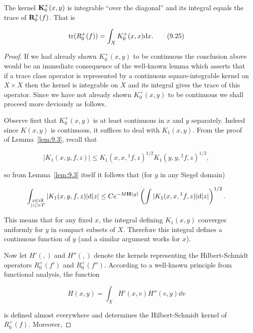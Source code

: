 \begin{theorem}\label{thm:9.7}

The kernel $\mathbf{K}_0^{+}(x, y)$ is integrable ``over the diagonal'' and its integral equals the trace of $\mathbf{R}_0^{+}(f)$. That is

\begin{equation}\label{eq:9.25}
\operatorname{tr}(R_0^{+}(f)) = \int_X K_0^{+}(x, x)\mathrm{d} x.\tag{9.25}
\end{equation}

\end{theorem}

\begin{proof}

If we had already shown $K_0^{+}(x,y)$ to be continuous the conclusion above would be an immediate consequence of the well-known lemma which asserts that if a trace class operator is represented by a continuous square-integrable kernel on $X \times X$ then the kernel is integrable on $X$ and its integral gives the trace of this operator. Since we have not already shown $K_0^{+}(x,y)$ to be continuous we shall proceed more deviously as follows.

Observe first that $K_0^{+}(x,y)$ is at least continuous in $x$ and $y$ separately. Indeed since $K(x,y)$ is continuous, it suffices to deal with $K_1(x,y)$. From the proof of Lemma~\ref{lem:9.3}, recall that

\[
|K_1(x, y, f, z)| \leq K_1(x, x, {}^{1}f, z)^{1/2}K_1(y, y, {}^{2}f, z)^{1/2},
\]

so from Lemma~\ref{lem:9.3} itself it follows that (for $y$ in any Siegel domain)

\[
\int_{\substack{z \in i\mathbb{R}\\ |z| > T}} |K_1(x, y, f, z)|\mathrm{d}|z| \leq Ce^{-M\mathbf{H}(y)}\left(\int |K_1(x, x, {}^{1}f, z)|\mathrm{d}|z|\right)^{1/2}.
\]

This means that for any fixed $x$, the integral defining $K_1(x,y)$ converges uniformly for $y$ in compact subsets of $X$. Therefore this integral defines a continuous function of $y$ (and a similar argument works for $x$).

Now let $H'(,)$ and $H''(,)$ denote the kernels representing the Hilbert-Schmidt operators $R_0^{+}(f')$ and $R_0^{+}(f'')$. According to a well-known principle from functional analysis, the function

\[
H(x, y) = \int_X H'(x, v)H''(v, y)\dd v
\]

is defined almost everywhere and determines the Hilbert-Schmidt kernel of $R_0^{+}(f)$. Moreover,


\end{proof}
